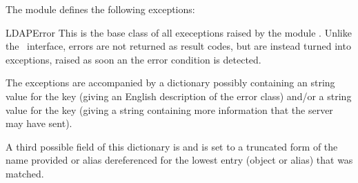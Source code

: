 The module defines the following exceptions:

\begin{excdesc}{LDAPError}
This is the base class of all execeptions raised by the module .
Unlike the \C\ interface, errors are not returned as result codes, but
are instead turned into exceptions, raised as soon an the error condition 
is detected.

The exceptions are accompanied by a dictionary possibly
containing an string value for the key  
(giving an English description of the error class)
and/or a string value for the key 
(giving a string containing more information that the server may have sent).

A third possible field of this dictionary is  and
is set to a truncated form of the name provided or alias dereferenced
for the lowest entry (object or alias) that was matched.

\end{excdesc}

